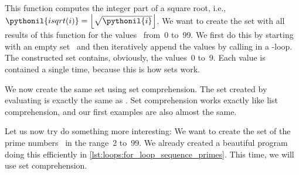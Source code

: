 This function computes the integer part of a square root, i.e., $\pythonil{isqrt(i)}=\left\lfloor\sqrt{\pythonil{i}}\right\rfloor$.
We want to create the set with all results of this function for the values~ from~0 to~99.
We first do this by starting with an empty set~ and then iteratively append the values by calling  in a -loop.
The constructed set contains, obviously, the values~0 to~9.
Each value is contained a single time, because this is how sets work.%
%
\begin{sloppypar}%
We now create the same set using set comprehension.
The set  created by evaluating  is exactly the same as .
Set comprehension works exactly like list comprehension, and our first examples are also almost the same.%
\end{sloppypar}%
%
Let us now try do something more interesting:
We want to create the set  of the prime numbers~\cite{W2024PN,CP2005PNACP,R1994PNACMFF} in the range~2 to~99.
We already created a beautiful program doing this efficiently in \cref{lst:loops:for_loop_sequence_primes}.
This time, we will use set comprehension.

